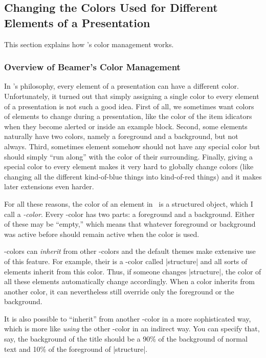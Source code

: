 \subsection{Changing the Colors Used for Different Elements of a Presentation}

This section explains how \beamer's color management works.



\subsubsection{Overview of Beamer's Color Management}

In \beamer's philosophy, every element of a presentation can have a
different color. Unfortunately, it turned out that simply assigning a
single color to every element of a presentation is not such a good
idea. First of all, we sometimes  want colors of elements to change
during a presentation, like the color of the item idicators when they
become alerted or inside an example block. Second, some elements
naturally have two colors, namely a foreground and a background, but
not always. Third, sometimes element somehow should not have any
special color but should simply ``run along'' with the color of their
surrounding. Finally, giving a special color to every element makes it
very hard to globally change colors (like changing all the different
kind-of-blue things into kind-of-red things) and it makes later
extensions even harder.

For all these reasons, the color of an element in \beamer\ is a
structured object, which I call a \emph{\beamer-color}. Every
\beamer-color has two parts: a foreground and a background. Either of
these may be ``empty,'' which means that whatever foreground or
background was active before should remain active when the color is
used.

\beamer-colors can \emph{inherit} from other \beamer-colors and the
default themes make extensive use of this feature. For example, their
is a \beamer-color called |structure| and all sorts of elements
inherit from this color. Thus, if someone changes |structure|, the
color of all these elements automatically change accordingly. When a
color inherits from another color, it can nevertheless still override
only the foreground or the background.

It is also possible to ``inherit'' from another \beamer-color in a more
sophisticated way, which is more like \emph{using} the other
\beamer-color in an indirect way. You can specify that, say, the
background of the title should be a 90\% of the background of normal
text and 10\% of the foreground of |structure|.

